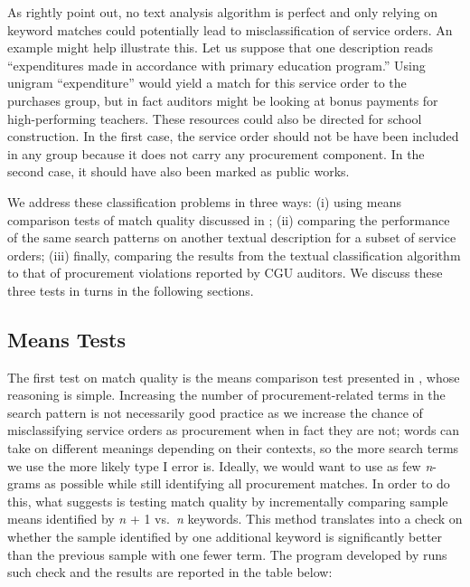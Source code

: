 \documentclass[11pt]{article}
\begin{document}
As \citet{GrimmerTextDataPromise2013a} rightly point out, no text analysis algorithm is perfect and only relying on keyword matches could potentially lead to misclassification of service orders. An example might help illustrate this. Let us suppose that one description reads ``expenditures made in accordance with primary education program.'' Using unigram ``expenditure'' would yield a match for this service order to the purchases group, but in fact auditors might be looking at bonus payments for high-performing teachers. These resources could also be directed for school construction. In the first case, the service order should not be have been included in any group because it does not carry any procurement component. In the second case, it should have also been marked as public works.

We address these classification problems in three ways: (i) using means comparison tests of match quality discussed in \citet{AssumpcaotextfindDataDrivenText2018}; (ii) comparing the performance of the same search patterns on another textual description for a subset of service orders; (iii) finally, comparing the results from the textual classification algorithm to that of procurement violations reported by CGU auditors. We discuss these three tests in turns in the following sections.

\subsection{Means Tests}\label{subsec:quality1}

The first test on match quality is the means comparison test presented in \citet{AssumpcaotextfindDataDrivenText2018}, whose reasoning is simple. Increasing the number of procurement-related terms in the search pattern is not necessarily good practice as we increase the chance of misclassifying service orders as procurement when in fact they are not; words can take on different meanings depending on their contexts, so the more search terms we use the more likely type I error is. Ideally, we would want to use as few \emph{n}-grams as possible while still identifying all procurement matches. In order to do this, what \citet{AssumpcaotextfindDataDrivenText2018} suggests is testing match quality by incrementally comparing sample means identified by \emph{n} + 1 vs.~\emph{n} keywords. This method translates into a check on whether the sample identified by one additional keyword is significantly better than the previous sample with one fewer term. The program developed by \citet{AssumpcaotextfindDataDrivenText2018} runs such check and the results are reported in the table below:

\end{document}
